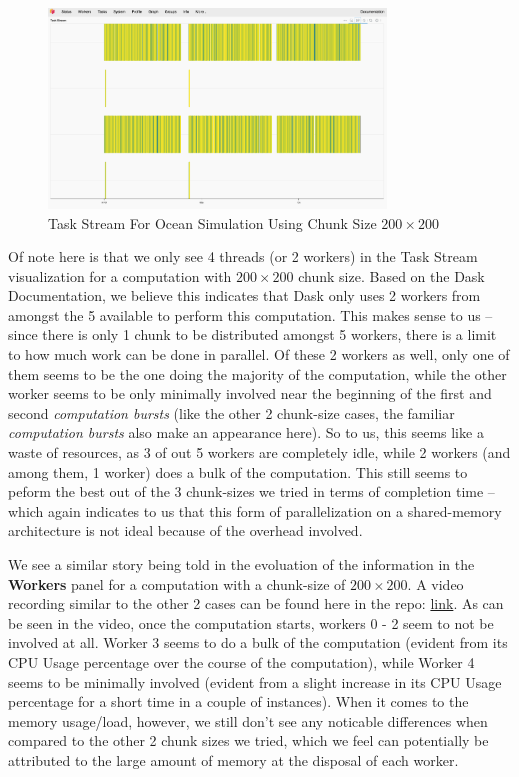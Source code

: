 \documentclass[a4paper,12pt]{article}
\begin{document}
\begin{itemize}
\begin{figure}[H]
  \centering
  \includegraphics[width=0.8\textwidth]{../images/task_stream_200chunk.png}
  \caption{Task Stream For Ocean Simulation Using Chunk Size $200 \times 200$}
\end{figure}

Of note here is that we only see 4 threads (or 2 workers) in the Task Stream visualization for a computation with $200 \times 200$ chunk size. Based on the Dask Documentation, we believe this indicates that Dask only uses 2 workers from amongst the 5 available to perform this computation. This makes sense to us -- since there is only 1 chunk to be distributed amongst 5 workers, there is a limit to how much work can be done in parallel. Of these 2 workers as well, only one of them seems to be the one doing the majority of the computation, while the other worker seems to be only minimally involved near the beginning of the first and second \textit{computation bursts} (like the other 2 chunk-size cases, the familiar \textit{computation bursts} also make an appearance here). So to us, this seems like a waste of resources, as 3 of out 5 workers are completely idle, while 2 workers (and among them, 1 worker) does a bulk of the computation. This still seems to peform the best out of the 3 chunk-sizes we tried in terms of completion time -- which again indicates to us that this form of parallelization on a shared-memory architecture is not ideal because of the overhead involved. 

We see a similar story being told in the evoluation of the information in the \textbf{Workers} panel for a computation with a chunk-size of $200 \times 200$. A video recording similar to the other 2 cases can be found here in the repo: \href{https://github.com/paulmyr/DD2358-HPC25/tree/master/04_parallel/bonus#chunk-size-200}{link}. As can be seen in the video, once the computation starts, workers 0 - 2 seem to not be involved at all. Worker 3 seems to do a bulk of the computation (evident from its CPU Usage percentage over the course of the computation), while Worker 4 seems to be minimally involved (evident from a slight increase in its CPU Usage percentage for a short time in a couple of instances). When it comes to the memory usage/load, however, we still don't see any noticable differences when compared to the other 2 chunk sizes we tried, which we feel can potentially be attributed to the large amount of memory at the disposal of each worker.


\end{itemize}
\end{document}
